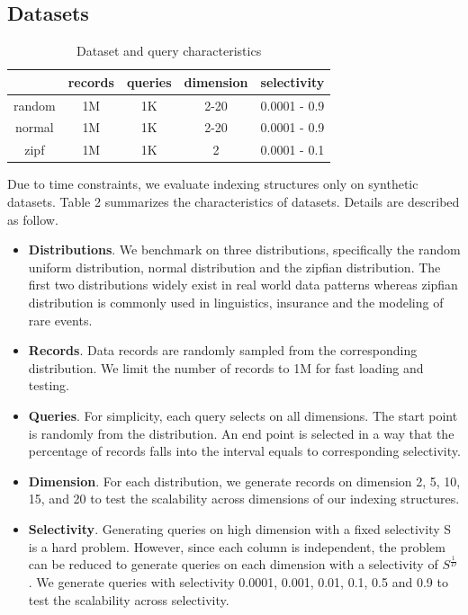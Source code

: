 \documentclass[sigconf,10pt]{acmart}
\begin{document}
\subsection{Datasets}

\begin{table}[h]
  \centering
  \begin{tabular}{|c|c|c|c|c|}
    \hline
          & records & queries & dimension & selectivity \\
    \hline
    random & 1M & 1K & 2-20 & 0.0001 - 0.9 \\
    \hline
    normal & 1M & 1K & 2-20 & 0.0001 - 0.9 \\
    \hline
    zipf & 1M & 1K & 2 & 0.0001 - 0.1 \\
    \hline 
  \end{tabular}
  \caption{Dataset and query characteristics}
  \label{table:dataset}
\end{table}

Due to time constraints, we evaluate indexing structures only on synthetic datasets.
Table 2 summarizes the characteristics of datasets. Details are described as follow.
\begin{itemize}
  \item \textbf{Distributions}. We benchmark on three distributions, specifically the random uniform
  distribution, normal distribution and the zipfian distribution. The first two distributions
  widely exist in real world data patterns whereas zipfian distribution is commonly used in
  linguistics, insurance and the modeling of rare events.
  \item \textbf{Records}. Data records are randomly sampled from the corresponding distribution.
  We limit the number of records to 1M for fast loading and testing.
  \item \textbf{Queries}. For simplicity, each query selects on all dimensions. The start
  point is randomly from the distribution. An end point is selected in a way that the
  percentage of records falls into the interval equals to corresponding selectivity.
  \item \textbf{Dimension}. For each distribution, we generate records on dimension 2, 5, 10, 15,
  and 20 to test the scalability across dimensions of our indexing structures.
  \item \textbf{Selectivity}. Generating queries on high dimension with a fixed selectivity S is
  a hard problem. However, since each column is independent, the problem can be reduced to generate
  queries on each dimension with a selectivity of $S^{\frac{1}{D}}$. We generate queries with
  selectivity 0.0001, 0.001, 0.01, 0.1, 0.5 and 0.9 to test the scalability across selectivity.
\end{itemize}
\end{document}
